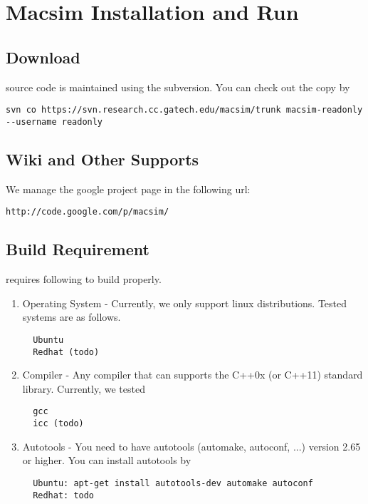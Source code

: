 
\clearpage
\section{Macsim Installation and Run}

\subsection{Download}

\SIM source code is maintained using the subversion. 
You can check out the \SIM copy by

\smallskip
\begin{lstlisting}
svn co https://svn.research.cc.gatech.edu/macsim/trunk macsim-readonly --username readonly
\end{lstlisting}
\smallskip


\subsection{Wiki and Other Supports}

We manage the google project page in the following url:

\smallskip
\begin{lstlisting}
http://code.google.com/p/macsim/
\end{lstlisting}
\smallskip


\subsection{Build Requirement}

\SIM requires following to build properly.

\begin{enumerate}

  \item Operating System - Currently, we only support linux
  distributions. Tested systems are as follows.

  \smallskip
  \begin{lstlisting}
  Ubuntu
  Redhat (todo)
  \end{lstlisting}
  \smallskip

  \item Compiler - Any compiler that can supports the C++0x (or C++11)
  standard library. Currently, we tested
        
  \smallskip 
  \begin{lstlisting}
  gcc   
  icc (todo)
  \end{lstlisting} 
  \smallskip

  \item Autotools - You need to have autotools (automake, autoconf,
  ...) version 2.65 or higher. You can install autotools by

  \smallskip
  \begin{lstlisting}
  Ubuntu: apt-get install autotools-dev automake autoconf
  Redhat: todo
  \end{lstlisting}
  \smallskip


\end{enumerate}

